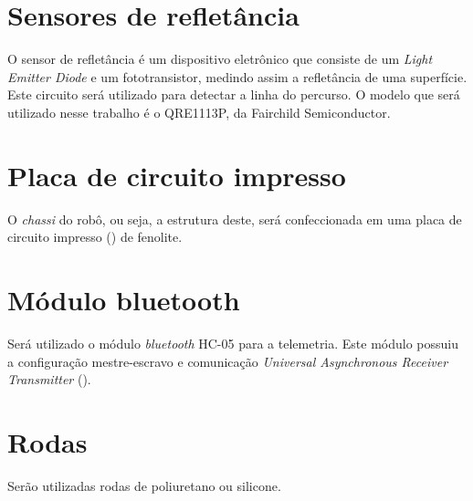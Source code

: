 \section{Sensores de refletância} \label{cap:reflet}
O sensor de refletância é um dispositivo eletrônico que consiste de um \textit{Light Emitter Diode} 
 e um fototransistor, medindo assim a refletância de uma superfície. Este circuito 
será utilizado para detectar a linha do percurso. 
O modelo que será utilizado nesse trabalho é o QRE1113P, da Fairchild %
Semiconductor\cite{reflet}.
\vspace{0.5cm}

\section{Placa de circuito impresso} \label{cap:chassi}
O \textit{chassi} do robô, ou seja, a estrutura deste, será confeccionada em uma placa de 
circuito impresso () de fenolite.
\vspace{0.5cm}


\section{Módulo bluetooth} \label{cap:bluetooth}
Será utilizado o módulo \textit{bluetooth} %
HC-05 para a telemetria. Este módulo possuiu a configuração 
mestre-escravo e comunicação \textit{Universal Asynchronous Receiver Transmitter} 
().

\vspace{0.5cm}


\section{Rodas} \label{cap:rodas}
Serão utilizadas rodas de poliuretano ou silicone.
\vspace{0.5cm}


